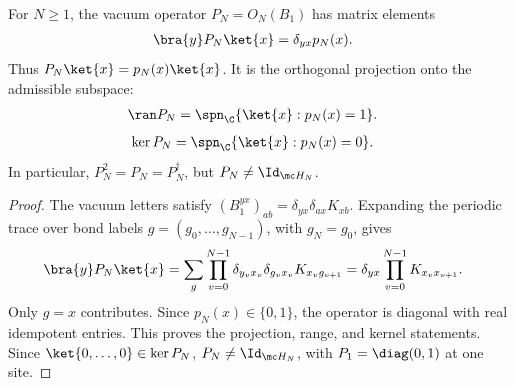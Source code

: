 \begin{lemma}
    \label{lem:asymex_fib_vacuum}
    \leanok
    For $N\geq1$, the vacuum operator $P_N=O_N(B_1)$ has matrix elements
    \begin{align}
        \bra{y}P_N\ket{x} & =\delta_{yx}p_N(x).
        \label{eq:asymex_fib_vacuum_kernel}
    \end{align}
    Thus $P_N\ket{x}=p_N(x)\ket{x}$. It is the orthogonal projection
    onto the admissible subspace:
    \begin{align}
        \ran P_N & =\spn_{\C}\{\ket{x}:p_N(x)=1\}.
        \label{eq:asymex_fib_vacuum_range}
    \end{align}
    \begin{align}
        \ker P_N & =\spn_{\C}\{\ket{x}:p_N(x)=0\}.
        \label{eq:asymex_fib_vacuum_null}
    \end{align}
    In particular, $P_N^2=P_N=P_N^\dagger$, but $P_N\neq\Id_{\mc H_N}$.
\end{lemma}

\begin{proof}
    \leanok
    The vacuum letters satisfy
    $(B_1^{yx})_{ab}=\delta_{yx}\delta_{ax}K_{xb}$.
    Expanding the periodic trace over bond labels
    $g=(g_0,\ldots,g_{N-1})$, with $g_N=g_0$, gives
    \begin{align}
        \bra{y}P_N\ket{x}
         & =\sum_g\prod_{v=0}^{N-1}
        \delta_{y_vx_v}\delta_{g_vx_v}K_{x_vg_{v+1}}
        =\delta_{yx}\prod_{v=0}^{N-1}K_{x_vx_{v+1}}.
    \end{align}
    Only $g=x$ contributes. Since $p_N(x)\in\{0,1\}$,
    the operator is diagonal with real idempotent entries.
    This proves the projection, range, and kernel statements.
    Since $\ket{0,\ldots,0}\in\ker P_N$, $P_N\neq\Id_{\mc H_N}$,
    with $P_1=\diag(0,1)$ at one site.
\end{proof}

